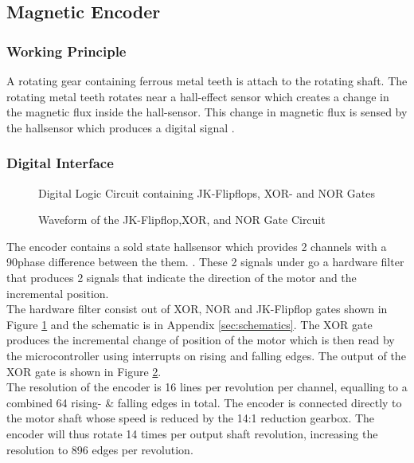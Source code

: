 \subsection{Magnetic Encoder}
\subsubsection{Working Principle}
A rotating gear containing ferrous metal teeth is attach to the rotating shaft. The rotating metal teeth rotates near a hall-effect sensor which creates a change in the magnetic flux inside the hall-sensor. This change in magnetic flux is sensed by the hallsensor which produces a digital signal \citep{hallsensor}.
\subsubsection{Digital Interface} 

\begin{figure}[h]
	\centering
	
	\caption{Digital Logic Circuit containing JK-Flipflops, XOR- and NOR Gates}
	\label{fig:jk_xor}
\end{figure}

\begin{figure}[h]
	\centering
	
	\caption{Waveform of the JK-Flipflop,XOR, and NOR Gate Circuit}
	\label{fig:jk_xor_waveform}
\end{figure}

The encoder contains a sold state hallsensor which provides 2 channels with a 90\textdegree \space phase difference between the them. \citep{faulhaberencoder}. These 2 signals under go a hardware filter that produces 2 signals that indicate the direction of the motor and the incremental position.\\

The hardware filter consist out of XOR, NOR and JK-Flipflop gates shown in Figure \ref{fig:jk_xor} and the schematic is in Appendix \ref{sec:schematics}. The XOR gate produces the incremental change of position of the motor which is then read by the microcontroller using interrupts on rising and falling edges. The output of the XOR gate is shown in Figure \ref{fig:jk_xor_waveform}.\\

The resolution of the encoder is 16 lines per revolution per channel, equalling to a combined 64 rising- \& falling edges in total. The encoder is connected directly to the motor shaft whose speed is reduced by the 14:1 reduction gearbox. The encoder will thus rotate 14 times per output shaft revolution, increasing the resolution to 896 edges per revolution.\\

